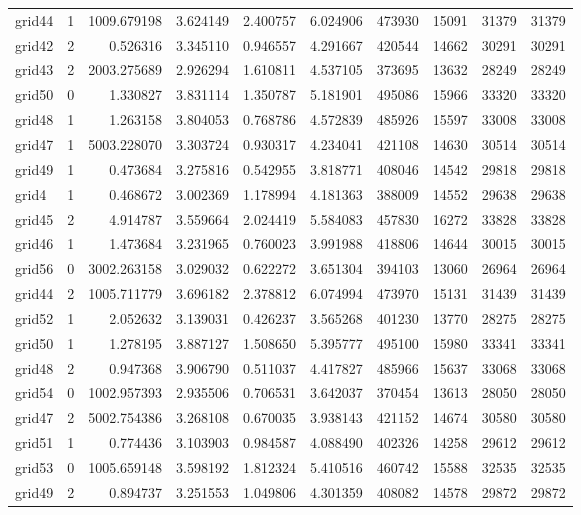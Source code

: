 \documentclass[../../../thesis.tex]{subfiles}
\begin{document}
\begin{longtable}{|l|r|r|r|r|r|r|r|r|r|}
grid44 & 1 & 1009.679198 & 3.624149 & 2.400757 & 6.024906 & 473930 & 15091 & 31379 & 31379 \\
grid42 & 2 & 0.526316 & 3.345110 & 0.946557 & 4.291667 & 420544 & 14662 & 30291 & 30291 \\
grid43 & 2 & 2003.275689 & 2.926294 & 1.610811 & 4.537105 & 373695 & 13632 & 28249 & 28249 \\
grid50 & 0 & 1.330827 & 3.831114 & 1.350787 & 5.181901 & 495086 & 15966 & 33320 & 33320 \\
grid48 & 1 & 1.263158 & 3.804053 & 0.768786 & 4.572839 & 485926 & 15597 & 33008 & 33008 \\
grid47 & 1 & 5003.228070 & 3.303724 & 0.930317 & 4.234041 & 421108 & 14630 & 30514 & 30514 \\
grid49 & 1 & 0.473684 & 3.275816 & 0.542955 & 3.818771 & 408046 & 14542 & 29818 & 29818 \\
grid4 & 1 & 0.468672 & 3.002369 & 1.178994 & 4.181363 & 388009 & 14552 & 29638 & 29638 \\
grid45 & 2 & 4.914787 & 3.559664 & 2.024419 & 5.584083 & 457830 & 16272 & 33828 & 33828 \\
grid46 & 1 & 1.473684 & 3.231965 & 0.760023 & 3.991988 & 418806 & 14644 & 30015 & 30015 \\
grid56 & 0 & 3002.263158 & 3.029032 & 0.622272 & 3.651304 & 394103 & 13060 & 26964 & 26964 \\
grid44 & 2 & 1005.711779 & 3.696182 & 2.378812 & 6.074994 & 473970 & 15131 & 31439 & 31439 \\
grid52 & 1 & 2.052632 & 3.139031 & 0.426237 & 3.565268 & 401230 & 13770 & 28275 & 28275 \\
grid50 & 1 & 1.278195 & 3.887127 & 1.508650 & 5.395777 & 495100 & 15980 & 33341 & 33341 \\
grid48 & 2 & 0.947368 & 3.906790 & 0.511037 & 4.417827 & 485966 & 15637 & 33068 & 33068 \\
grid54 & 0 & 1002.957393 & 2.935506 & 0.706531 & 3.642037 & 370454 & 13613 & 28050 & 28050 \\
grid47 & 2 & 5002.754386 & 3.268108 & 0.670035 & 3.938143 & 421152 & 14674 & 30580 & 30580 \\
grid51 & 1 & 0.774436 & 3.103903 & 0.984587 & 4.088490 & 402326 & 14258 & 29612 & 29612 \\
grid53 & 0 & 1005.659148 & 3.598192 & 1.812324 & 5.410516 & 460742 & 15588 & 32535 & 32535 \\
grid49 & 2 & 0.894737 & 3.251553 & 1.049806 & 4.301359 & 408082 & 14578 & 29872 & 29872 \\

\end{longtable}
\end{document}
